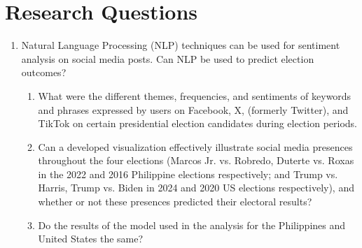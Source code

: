 \section{Research Questions}

\begin{enumerate}
    \item Natural Language Processing (NLP) techniques can be used for sentiment analysis on social media posts. Can NLP be used to predict election outcomes?
    \begin{enumerate}
        \item What were the different themes, frequencies, and sentiments of keywords and phrases expressed by users on Facebook, X, (formerly Twitter), and TikTok on certain presidential election candidates during election periods.
        \item Can a developed visualization effectively illustrate social media presences throughout the four elections (Marcos Jr. vs. Robredo, Duterte vs. Roxas in the 2022 and 2016 Philippine elections respectively; and Trump vs. Harris, Trump vs. Biden in 2024 and 2020 US elections respectively), and whether or not these presences predicted their electoral results?
        \item Do the results of the model used in the analysis for the Philippines and United States the same?
    \end{enumerate}
\end{enumerate}